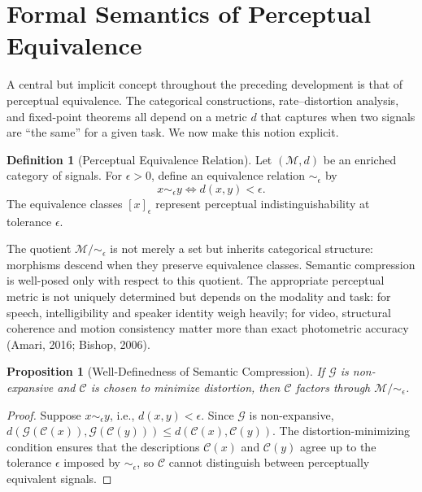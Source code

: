 \documentclass[11pt,a4paper]{article}
\newtheorem{proposition}[theorem]{Proposition}
\theoremstyle{definition}
\newtheorem{definition}[theorem]{Definition}
\theoremstyle{remark}
\begin{document}
\section{Formal Semantics of Perceptual Equivalence}
\label{sec:perceptual_equivalence}

A central but implicit concept throughout the preceding development is that of perceptual equivalence. The categorical constructions, rate--distortion analysis, and fixed-point theorems all depend on a metric $d$ that captures when two signals are ``the same'' for a given task. We now make this notion explicit.

\begin{definition}[Perceptual Equivalence Relation]
Let $(\mathcal{M}, d)$ be an enriched category of signals. For $\epsilon > 0$, define an equivalence relation $\sim_\epsilon$ by
\[
x \sim_\epsilon y \iff d(x,y) < \epsilon.
\]
The equivalence classes $[x]_\epsilon$ represent perceptual indistinguishability at tolerance $\epsilon$.
\end{definition}

The quotient $\mathcal{M}/\!\sim_\epsilon$ is not merely a set but inherits categorical structure: morphisms descend when they preserve equivalence classes. Semantic compression is well-posed only with respect to this quotient. The appropriate perceptual metric is not uniquely determined but depends on the modality and task: for speech, intelligibility and speaker identity weigh heavily; for video, structural coherence and motion consistency matter more than exact photometric accuracy (Amari, 2016; Bishop, 2006).

\begin{proposition}[Well-Definedness of Semantic Compression]
If $\mathcal{G}$ is non-expansive and $\mathcal{C}$ is chosen to minimize distortion, then $\mathcal{C}$ factors through $\mathcal{M}/\!\sim_\epsilon$.
\end{proposition}

\begin{proof}
Suppose $x \sim_\epsilon y$, i.e., $d(x,y) < \epsilon$. Since $\mathcal{G}$ is non-expansive, $d(\mathcal{G}(\mathcal{C}(x)), \mathcal{G}(\mathcal{C}(y))) \le d(\mathcal{C}(x), \mathcal{C}(y))$. The distortion-minimizing condition ensures that the descriptions $\mathcal{C}(x)$ and $\mathcal{C}(y)$ agree up to the tolerance $\epsilon$ imposed by $\sim_\epsilon$, so $\mathcal{C}$ cannot distinguish between perceptually equivalent signals.
\end{proof}
\end{document}
